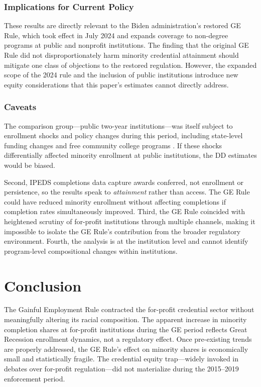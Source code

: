 \documentclass[12pt]{article}
\begin{document}
\subsubsection*{Implications for Current Policy} These results are directly relevant to the Biden administration's restored GE Rule, which took effect in July 2024 and expands coverage to non-degree programs at public and nonprofit institutions. The finding that the original GE Rule did not disproportionately harm minority credential attainment should mitigate one class of objections to the restored regulation. However, the expanded scope of the 2024 rule and the inclusion of public institutions introduce new equity considerations that this paper's estimates cannot directly address.

\subsubsection*{Caveats} The comparison group---public two-year institutions---was itself subject to enrollment shocks and policy changes during this period, including state-level funding changes and free community college programs \citep{DynerskiScott2021, HoxbyAvery2013}. If these shocks differentially affected minority enrollment at public institutions, the DD estimates would be biased.

Second, IPEDS completions data capture awards conferred, not enrollment or persistence, so the results speak to \textit{attainment} rather than access. The GE Rule could have reduced minority enrollment without affecting completions if completion rates simultaneously improved. Third, the GE Rule coincided with heightened scrutiny of for-profit institutions through multiple channels, making it impossible to isolate the GE Rule's contribution from the broader regulatory environment. Fourth, the analysis is at the institution level and cannot identify program-level compositional changes within institutions.


\section{Conclusion}

The Gainful Employment Rule contracted the for-profit credential sector without meaningfully altering its racial composition. The apparent increase in minority completion shares at for-profit institutions during the GE period reflects Great Recession enrollment dynamics, not a regulatory effect. Once pre-existing trends are properly addressed, the GE Rule's effect on minority shares is economically small and statistically fragile. The credential equity trap---widely invoked in debates over for-profit regulation---did not materialize during the 2015--2019 enforcement period.
\end{document}
